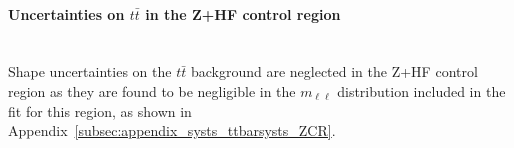 


\paragraph{Uncertainties on $t\bar{t}$ in the Z+HF control region}\mbox{}\\

Shape uncertainties on the $t\bar{t}$ background are neglected in the Z+HF 
control region as they are found to be negligible in the $m_{\ell\ell}$ distribution included in the fit for this region, as shown in Appendix~\ref{subsec:appendix_systs_ttbarsysts_ZCR}.
